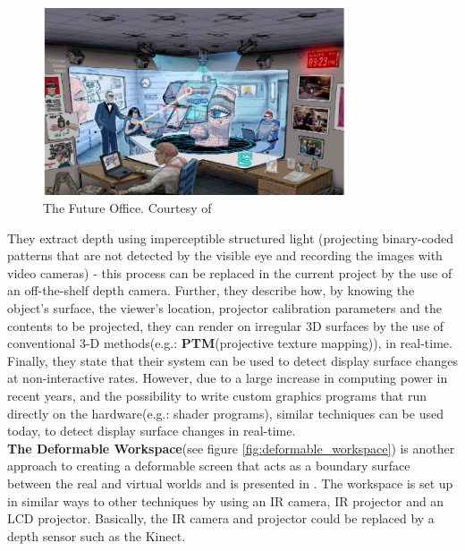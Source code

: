 \documentclass[]{article}
\begin{document}
\begin{figure}[hbtp]
    \centering
    \includegraphics[width=0.8\textwidth]{figures/FutureOffice.PNG}
    \caption{The Future Office. Courtesy of \cite{raskar98}}
    \label{fig:future_office}
\end{figure}

They extract depth using imperceptible structured light (projecting binary-coded patterns that are not detected by the visible eye and recording the images with video cameras) - this process can be replaced in the current project by the use of an off-the-shelf depth camera. Further, they describe how, by knowing the object's surface, the viewer's location, projector calibration parameters and the contents to be projected, they can render on irregular 3D surfaces by the use of conventional 3-D methods(e.g.: \textbf{PTM}(projective texture mapping)), in real-time. Finally, they state that their system can be used to detect display surface changes at non-interactive rates. However, due to a large increase in computing power in recent years, and the possibility to write custom graphics programs that run directly on the hardware(e.g.: shader programs), similar techniques can be used today, to detect display surface changes in real-time.\\

\textbf{The Deformable Workspace}(see figure \ref{fig:deformable_workspace}) is another approach to creating a deformable screen that acts as a boundary surface between the real and virtual worlds and is presented in \cite{watanabe08}. The workspace is set up in similar ways to other techniques by using an IR camera, IR projector and an LCD projector. Basically, the IR camera and projector could be replaced by a depth sensor such as the Kinect. 
\end{document}
